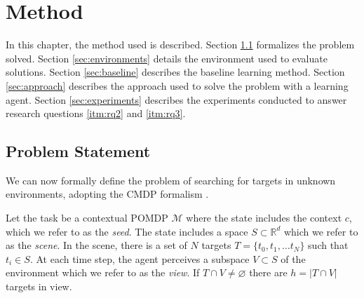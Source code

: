 \chapter{Method}
\label{cha:method}


% 

In this chapter, the method used is described.
Section \ref{sec:problem} formalizes the problem solved.
Section \ref{sec:environments} details the environment used to evaluate solutions.
Section \ref{sec:baseline} describes the baseline learning method.
Section \ref{sec:approach} describes the approach used to solve the problem with a learning agent.
Section \ref{sec:experiments} describes the experiments conducted to answer research questions \ref{itm:rq2} and \ref{itm:rq3}.

\section{Problem Statement}
\label{sec:problem}


We can now formally define the problem of searching for targets in unknown environments,
adopting the CMDP formalism \cite{kirk_survey_2022}.

Let the task be a contextual POMDP \(\mathcal{M}\) where the state includes the context \(c\), which we refer to as the \textit{seed}.
The state includes a space \(S \subset \mathbb{R}^d\) which we refer to as the \textit{scene}.
In the scene, there is a set of \(N\) targets \(T = \{t_0, t_1, \dots t_N\}\) such that \(t_i \in S\).
At each time step, the agent perceives a subspace \(V \subset S\) of the environment which we refer to as the \textit{view}.
If \(T \cap V \neq \varnothing\) there are \(h = \left\lvert T \cap V \right\rvert\) targets in view.

